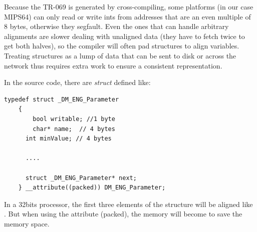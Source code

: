 Because the TR-069 is generated by cross-compiling, some platforms (in our case MIPS64) can only read or write ints from addresses that are an even multiple of 8 bytes, otherwise they segfault. Even the ones that can handle arbitrary alignments are slower dealing with unaligned data (they have to fetch twice to get both halves), so the compiler will often pad structures to align variables. Treating structures as a lump of data that can be sent to disk or across the network thus requires extra work to ensure a consistent representation.

In the source code, there are \textit{struct} defined like:
\begin{lstlisting}[mathescape]
    typedef struct _DM_ENG_Parameter
    {
    	bool writable; //1 byte
    	char* name;  // 4 bytes
      int minValue; // 4 bytes

      ....

      struct _DM_ENG_Parameter* next;
    } __attribute((packed)) DM_ENG_Parameter;
\end{lstlisting}


In a 32bits processor, the first three elements of the structure will be aligned like . But when using the attribute (packed), the memory will become  to save the memory space.

